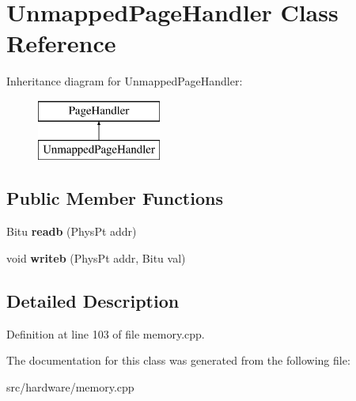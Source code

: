 \hypertarget{classUnmappedPageHandler}{\section{Unmapped\-Page\-Handler Class Reference}
\label{classUnmappedPageHandler}
}
Inheritance diagram for Unmapped\-Page\-Handler\-:\begin{figure}[H]
\begin{center}
\leavevmode
\includegraphics[height=2.000000cm]{classUnmappedPageHandler}
\end{center}
\end{figure}
\subsection*{Public Member Functions}
\begin{DoxyCompactItemize}
\item 
\hypertarget{classUnmappedPageHandler_ae907b93df3e6a3de14944c0226017e03}{Bitu {\bfseries readb} (Phys\-Pt addr)}\label{classUnmappedPageHandler_ae907b93df3e6a3de14944c0226017e03}

\item 
\hypertarget{classUnmappedPageHandler_a9158fb668304825dc4f78adb47666a74}{void {\bfseries writeb} (Phys\-Pt addr, Bitu val)}\label{classUnmappedPageHandler_a9158fb668304825dc4f78adb47666a74}

\end{DoxyCompactItemize}


\subsection{Detailed Description}


Definition at line 103 of file memory.\-cpp.



The documentation for this class was generated from the following file\-:\begin{DoxyCompactItemize}
\item 
src/hardware/memory.\-cpp\end{DoxyCompactItemize}
